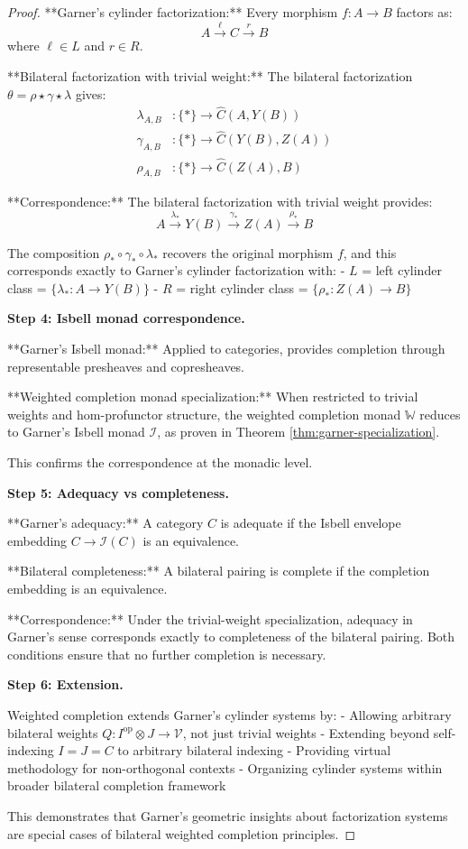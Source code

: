 \documentclass[11pt]{article}
\theoremstyle{plain}
\theoremstyle{definition}
\theoremstyle{remark}
\newcommand{\V}{\mathcal{V}}
\newcommand{\op}{\mathrm{op}}
\newcommand{\wh}[1]{\widehat{#1}}
\begin{document}
\begin{proof}
**Garner's cylinder factorization:** Every morphism $f : A \to B$ factors as:
$$A \xrightarrow{\ell} C \xrightarrow{r} B$$
where $\ell \in L$ and $r \in R$.

**Bilateral factorization with trivial weight:** The bilateral factorization $\theta = \rho \star \gamma \star \lambda$ gives:
\begin{align}
\lambda_{A,B} &: \{*\} \to \wh{C}(A, Y(B)) \\
\gamma_{A,B} &: \{*\} \to \wh{C}(Y(B), Z(A)) \\
\rho_{A,B} &: \{*\} \to \wh{C}(Z(A), B)
\end{align}

**Correspondence:** The bilateral factorization with trivial weight provides:
$$A \xrightarrow{\lambda_*} Y(B) \xrightarrow{\gamma_*} Z(A) \xrightarrow{\rho_*} B$$

The composition $\rho_* \circ \gamma_* \circ \lambda_*$ recovers the original morphism $f$, and this corresponds exactly to Garner's cylinder factorization with:
- $L$ = left cylinder class = $\{\lambda_* : A \to Y(B)\}$
- $R$ = right cylinder class = $\{\rho_* : Z(A) \to B\}$

\textbf{Step 4: Isbell monad correspondence.}

**Garner's Isbell monad:** Applied to categories, provides completion through representable presheaves and copresheaves.

**Weighted completion monad specialization:** When restricted to trivial weights and hom-profunctor structure, the weighted completion monad $\mathbb{W}$ reduces to Garner's Isbell monad $\mathcal{I}$, as proven in Theorem \ref{thm:garner-specialization}.

This confirms the correspondence at the monadic level.

\textbf{Step 5: Adequacy vs completeness.}

**Garner's adequacy:** A category $C$ is adequate if the Isbell envelope embedding $C \to \mathcal{I}(C)$ is an equivalence.

**Bilateral completeness:** A bilateral pairing is complete if the completion embedding is an equivalence.

**Correspondence:** Under the trivial-weight specialization, adequacy in Garner's sense corresponds exactly to completeness of the bilateral pairing. Both conditions ensure that no further completion is necessary.

\textbf{Step 6: Extension.}

Weighted completion extends Garner's cylinder systems by:
- Allowing arbitrary bilateral weights $Q : I^{\op} \otimes J \to \V$, not just trivial weights
- Extending beyond self-indexing $I = J = C$ to arbitrary bilateral indexing
- Providing virtual methodology for non-orthogonal contexts
- Organizing cylinder systems within broader bilateral completion framework

This demonstrates that Garner's geometric insights about factorization systems are special cases of bilateral weighted completion principles.
\end{proof}
\end{document}
